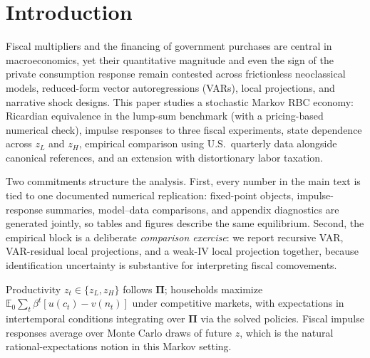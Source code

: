 \documentclass[11pt,a4paper]{article}
\begin{document}
\section{Introduction}

Fiscal multipliers and the financing of government purchases are central in macroeconomics, yet their quantitative magnitude and even the sign of the private consumption response remain contested across frictionless neoclassical models, reduced-form vector autoregressions (VARs), local projections, and narrative shock designs. This paper studies a stochastic Markov RBC economy: Ricardian equivalence in the lump-sum benchmark (with a pricing-based numerical check), impulse responses to three fiscal experiments, state dependence across $z_L$ and $z_H$, empirical comparison using U.S.\ quarterly data alongside canonical references, and an extension with distortionary labor taxation.

Two commitments structure the analysis. First, every number in the main text is tied to one documented numerical replication: fixed-point objects, impulse-response summaries, model--data comparisons, and appendix diagnostics are generated jointly, so tables and figures describe the same equilibrium. Second, the empirical block is a deliberate \emph{comparison exercise}: we report recursive VAR, VAR-residual local projections, and a weak-IV local projection together, because identification uncertainty is substantive for interpreting fiscal comovements.

Productivity $z_t\in\{z_L,z_H\}$ follows $\bm{\Pi}$; households maximize $\mathbb{E}_0\sum_t \beta^t[u(c_t)-v(n_t)]$ under competitive markets, with expectations in intertemporal conditions integrating over $\bm{\Pi}$ via the solved policies. Fiscal impulse responses average over Monte Carlo draws of future $z$, which is the natural rational-expectations notion in this Markov setting.
\end{document}

